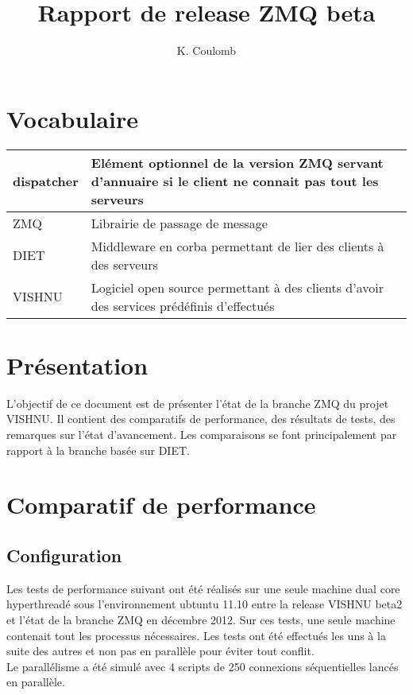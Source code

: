 \documentclass{article}
\title{Rapport de release ZMQ beta}
\author{K. Coulomb}
\begin{document}
\frontmatter %
\maketitle %
\tableofcontents %
\mainmatter %



\section{Vocabulaire}

\begin{tabular}{|l|l|}
\hline
dispatcher & Elément optionnel de la version ZMQ servant d'annuaire si le client ne connait pas tout les serveurs \\
\hline
ZMQ & Librairie de passage de message \\
\hline
DIET & Middleware en corba permettant de lier des clients à des serveurs \\
\hline
VISHNU & Logiciel open source permettant à des clients d'avoir des services prédéfinis d'effectués \\
\hline
\end{tabular}

\section{Pr\'esentation}

L'objectif de ce document est de présenter l'état de la branche
ZMQ du projet VISHNU. Il contient des comparatifs de performance,
des résultats de tests, des remarques sur l'état d'avancement.
Les comparaisons se font principalement par rapport à la branche
basée sur DIET.

\section{Comparatif de performance}

\subsection{Configuration}
Les tests de performance suivant ont été réalisés sur une seule
machine dual core hyperthreadé sous l'environnement ubtuntu 11.10
entre la release VISHNU beta2 et l'état de la branche ZMQ en 
décembre 2012. Sur ces tests, une seule machine contenait tout 
les processus nécessaires. Les tests ont été effectués les uns
à la suite des autres et non pas en parallèle pour éviter tout
conflit. \\
Le parallélisme a été simulé avec 4 scripts de 250 connexions séquentielles lancés en parallèle.
\end{document}
